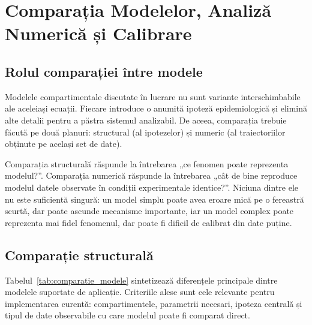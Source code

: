 
\chapter{Comparația Modelelor, Analiză Numerică și Calibrare}
\label{ch:comparatie_calibrare}

\section{Rolul comparației între modele}
\label{sec:rol_comparatie_modele}

Modelele compartimentale discutate în lucrare nu sunt variante
interschimbabile ale aceleiași ecuații. Fiecare introduce o anumită
ipoteză epidemiologică și elimină alte detalii pentru a păstra sistemul
analizabil. De aceea, comparația trebuie făcută pe două planuri:
structural (al ipotezelor) și numeric (al traiectoriilor obținute pe același
set de date).

Comparația structurală răspunde la întrebarea „ce fenomen poate reprezenta
modelul?”. Comparația numerică răspunde la întrebarea „cât de bine reproduce
modelul datele observate în condiții experimentale identice?”. Niciuna dintre
ele nu este suficientă singură: un model simplu poate avea eroare mică pe o
fereastră scurtă, dar poate ascunde mecanisme importante, iar un model
complex poate reprezenta mai fidel fenomenul, dar poate fi dificil de
calibrat din date puține.

\section{Comparație structurală}
\label{sec:comparatie_structurala}

Tabelul~\ref{tab:comparatie_modele} sintetizează diferențele principale dintre
modelele suportate de aplicație. Criteriile alese sunt cele relevante pentru
implementarea curentă: compartimentele, parametrii necesari, ipoteza centrală și
tipul de date observabile cu care modelul poate fi comparat direct.

